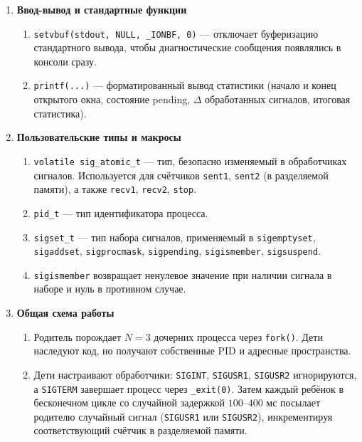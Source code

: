 \begin{enumerate}
        \item \textbf{Ввод-вывод и стандартные функции}

        \begin{enumerate}
            \item \texttt{setvbuf(stdout, NULL, \_IONBF, 0)} — отключает буферизацию стандартного вывода, чтобы диагностические сообщения появлялись в консоли сразу.
            \item \texttt{printf(...)} — форматированный вывод статистики (начало и конец открытого окна, состояние pending, $\Delta$ обработанных сигналов, итоговая статистика).
        \end{enumerate}

        \item \textbf{Пользовательские типы и макросы}

        \begin{enumerate}
            \item \texttt{volatile sig\_atomic\_t} — тип, безопасно изменяемый в обработчиках сигналов. Используется для счётчиков \texttt{sent1}, \texttt{sent2} (в разделяемой памяти), а также \texttt{recv1}, \texttt{recv2}, \texttt{stop}.
            \item \texttt{pid\_t} — тип идентификатора процесса.
            \item \texttt{sigset\_t} — тип набора сигналов, применяемый в \texttt{sigemptyset}, \texttt{sigaddset}, \texttt{sigprocmask}, \texttt{sigpending}, \texttt{sigismember}, \texttt{sigsuspend}.
            \item \texttt{sigismember} возвращает ненулевое значение при наличии сигнала в наборе и нуль в противном случае.
        \end{enumerate}

        \item \textbf{Общая схема работы}

        \begin{enumerate}
            \item Родитель порождает $N = 3$ дочерних процесса через \texttt{fork()}. Дети наследуют код, но получают собственные PID и адресные пространства.

            \item Дети настраивают обработчики: \texttt{SIGINT}, \texttt{SIGUSR1}, \texttt{SIGUSR2} игнорируются, а \texttt{SIGTERM} завершает процесс через \texttt{\_exit(0)}. Затем каждый ребёнок в бесконечном цикле со случайной задержкой $100$--$400$ мс посылает родителю случайный сигнал (\texttt{SIGUSR1} или \texttt{SIGUSR2}), инкрементируя соответствующий счётчик в разделяемой памяти.


\end{enumerate}
\end{enumerate}
